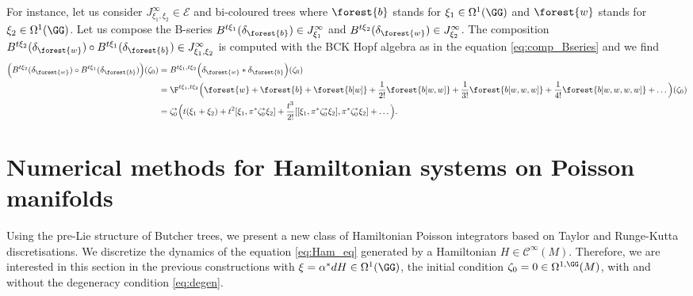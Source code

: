 \documentclass[a4paper,11pt]{article}
\newcommand{\func}[1]{\mathcal{C}^{\infty}(#1)}
\begin{document}
For instance, let us consider $J^\infty_{\xi_1,\xi_2} \in \mathcal{E}$ and bi-coloured trees where $\forest{b}$ stands for $\xi_1 \in \Omega^1(\GG)$ and $\forest{w}$ stands for $\xi_2 \in \Omega^1(\GG)$.
Let us compose the B-series $B^{t\xi_1}(\delta_{\forest{b}}) \in J^{\infty}_{\xi_1}$ and $B^{t\xi_2}(\delta_{\forest{w}}) \in J^{\infty}_{\xi_2}$. The composition $B^{t\xi_2}(\delta_{\forest{w}}) \circ B^{t\xi_1}(\delta_{\forest{b}}) \in J^{\infty}_{\xi_1, \xi_2}$ is computed with the BCK Hopf algebra as in the equation \eqref{eq:comp_Bseries} and we find
\begin{align*}
\Bigl(B^{t\xi_2}(\delta_{\forest{w}}) \circ B^{t\xi_1}(\delta_{\forest{b}})\Bigr)(\zeta_0)
&=B^{t\xi_1,t\xi_2}\Bigl(\delta_{\forest{w}}*\delta_{\forest{b}}\Bigr)(\zeta_0)\\
&=\F^{t\xi_1,t\xi_2}\Big(
\forest{w}
+\forest{b}
+\forest{b[w]}
+\frac{1}{2!}\forest{b[w,w]}
+\frac{1}{3!}\forest{b[w,w,w]}
+\frac{1}{4!}\forest{b[w,w,w,w]}
+\dots
\Big)(\zeta_0)\\
&=\zeta_0^*\Big(
t(\xi_1+\xi_2)
+t^2 [\xi_1,\pi^*\zeta_0^* \xi_2]
+\frac{t^3}{2!}[[\xi_1,\pi^*\zeta_0^* \xi_2],\pi^*\zeta_0^* \xi_2]
+\dots
\Big).
\end{align*}


























\section{Numerical methods for Hamiltonian systems on Poisson manifolds}\label{sec:num}

Using the pre-Lie structure of Butcher trees, we present a new class of Hamiltonian Poisson integrators based on Taylor and Runge-Kutta discretisations. We discretize the dynamics of the equation \eqref{eq:Ham_eq} generated by a Hamiltonian $H \in \func{M}.$ Therefore, we are interested in this section in the previous constructions with $\xi = \alpha^* dH \in \Omega^1(\GG)$, the initial condition $\zeta_0 = 0 \in \Omega^{1, \GG}(M)$, with and without the degeneracy condition \eqref{eq:degen}.
\end{document}

